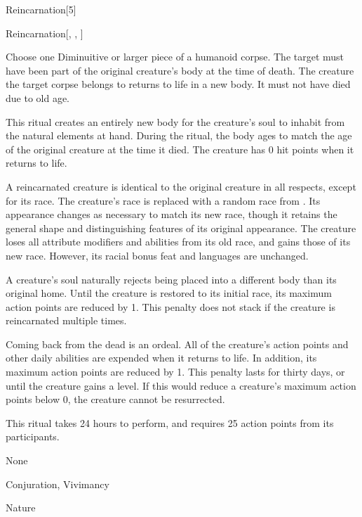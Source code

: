 \begin{spellsection}{Reincarnation}[5]


\begin{ability}{Reincarnation}[, , ]

Choose one Diminuitive or larger piece of a humanoid corpse.
The target must have been part of the original creature's body at the time of death.
The creature the target corpse belongs to returns to life in a new body.
It must not have died due to old age.

This ritual creates an entirely new body for the creature's soul to inhabit from the natural elements at hand.
During the ritual, the body ages to match the age of the original creature at the time it died.
The creature has 0 hit points when it returns to life.

A reincarnated creature is identical to the original creature in all respects, except for its race.
The creature's race is replaced with a random race from .
Its appearance changes as necessary to match its new race, though it retains the general shape and distinguishing features of its original appearance.
The creature loses all attribute modifiers and abilities from its old race, and gains those of its new race.
However, its racial bonus feat and languages are unchanged.

A creature's soul naturally rejects being placed into a different body than its original home.
Until the creature is restored to its initial race, its maximum action points are reduced by 1.
This penalty does not stack if the creature is reincarnated multiple times.

Coming back from the dead is an ordeal.
All of the creature's action points and other daily abilities are expended when it returns to life.
In addition, its maximum action points are reduced by 1.
This penalty lasts for thirty days, or until the creature gains a level.
If this would reduce a creature's maximum action points below 0, the creature cannot be resurrected.

This ritual takes 24 hours to perform, and requires 25 action points from its participants.

\end{ability}


 None

 Conjuration, Vivimancy

 Nature
\end{spellsection}


